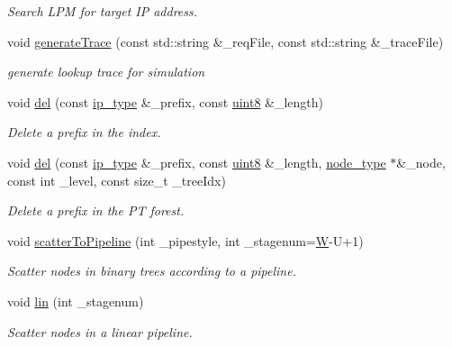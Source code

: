 \begin{DoxyCompactItemize}
\begin{DoxyCompactList}\small\item\em Search L\-P\-M for target I\-P address. \end{DoxyCompactList}\item 
void \hyperlink{classRPTree_a34075e21a5950b2b5cc8f0690c8a48de}{generate\-Trace} (const std\-::string \&\-\_\-req\-File, const std\-::string \&\-\_\-trace\-File)
\begin{DoxyCompactList}\small\item\em generate lookup trace for simulation \end{DoxyCompactList}\item 
void \hyperlink{classRPTree_a20ea61b0c093874754acf972c3382b4e}{del} (const \hyperlink{classRPTree_a247a4b90a027365aa8cc94c69ba141d1}{ip\-\_\-type} \&\-\_\-prefix, const \hyperlink{types_8h_a34ecedcf03a70dc91e4616212d79267d}{uint8} \&\-\_\-length)
\begin{DoxyCompactList}\small\item\em Delete a prefix in the index. \end{DoxyCompactList}\item 
void \hyperlink{classRPTree_ae0f09a56c8dc663e5c6331fc6de8615b}{del} (const \hyperlink{classRPTree_a247a4b90a027365aa8cc94c69ba141d1}{ip\-\_\-type} \&\-\_\-prefix, const \hyperlink{types_8h_a34ecedcf03a70dc91e4616212d79267d}{uint8} \&\-\_\-length, \hyperlink{classRPTree_a9ebcf5a1e56890f2ab50a8a1c700c35f}{node\-\_\-type} $\ast$\&\-\_\-node, const int \-\_\-level, const size\-\_\-t \-\_\-tree\-Idx)
\begin{DoxyCompactList}\small\item\em Delete a prefix in the P\-T forest. \end{DoxyCompactList}\item 
void \hyperlink{classRPTree_a37c93b56fd01c69c8cb564ae1aa4a3e0}{scatter\-To\-Pipeline} (int \-\_\-pipestyle, int \-\_\-stagenum=\hyperlink{test__u128_8cpp_ab21b528bc38899d04d3a7053e52fb797}{W}-\/U+1)
\begin{DoxyCompactList}\small\item\em Scatter nodes in binary trees according to a pipeline. \end{DoxyCompactList}\item 
void \hyperlink{classRPTree_a80926b28e7a4b9def3d283721470c463}{lin} (int \-\_\-stagenum)
\begin{DoxyCompactList}\small\item\em Scatter nodes in a linear pipeline. \end{DoxyCompactList}\item 

\end{DoxyCompactItemize}

